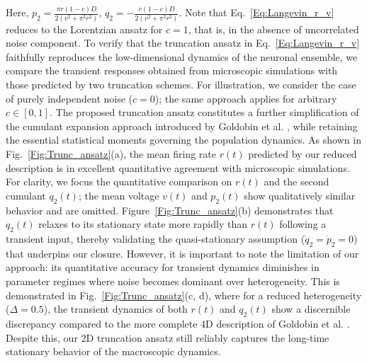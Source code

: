 \documentclass[aps,twocolumn,pre]{revtex4-2}
\begin{document}
Here, $p_2 = \frac{\pi r(1-c)D}{2(v^2 + \pi^2r^2)}$, $q_2 = -\frac{ v(1-c)D}{2(v^2 + \pi^2r^2)}$. Note that Eq.~\eqref{Eq:Langevin_r_v} reduces to the Lorentzian ansatz \cite{montbrio2015macroscopic} for $c=1$, that is, in the absence of uncorrelated noise component. To verify that the truncation ansatz in Eq.~\eqref{Eq:Langevin_r_v} faithfully reproduces the low-dimensional dynamics of the neuronal ensemble, we compare the transient responses obtained from microscopic simulations with those predicted by two truncation schemes. For illustration, we consider the case of purely independent noise ($c=0$); the same approach applies for arbitrary $c \in [0,1]$. The proposed truncation ansatz constitutes a further simplification of the cumulant expansion approach introduced by Goldobin et al. \cite{goldobin2021reduction}, while retaining the essential statistical moments governing the population dynamics. As shown in Fig.~\ref{Fig:Trunc_ansatz}(a), the mean firing rate $r(t)$ predicted by our reduced description is in excellent quantitative agreement with microscopic simulations. For clarity, we focus the quantitative comparison on $r(t)$ and the second cumulant $q_2(t)$; the mean voltage $v(t)$ and $p_2(t)$ show qualitatively similar behavior and are omitted. Figure~\ref{Fig:Trunc_ansatz}(b) demonstrates that $q_2(t)$ relaxes to its stationary state more rapidly than $r(t)$ following a transient input, thereby validating the quasi-stationary assumption ($\dot{q}_2 = \dot{p}_2 = 0$) that underpins our closure. However, it is important to note the limitation of our approach: its quantitative accuracy for transient dynamics diminishes in parameter regimes where  noise becomes dominant over heterogeneity. This is demonstrated in Fig.~\ref{Fig:Trunc_ansatz}(c, d), where for a reduced heterogeneity ($\Delta=0.5$), the transient dynamics of both $r(t)$ and $q_2(t)$ show a discernible discrepancy compared to the more complete 4D description of Goldobin et al. \cite{goldobin2021reduction}. Despite this, our 2D truncation ansatz still reliably captures the long-time stationary behavior of the macroscopic dynamics.
\end{document}
